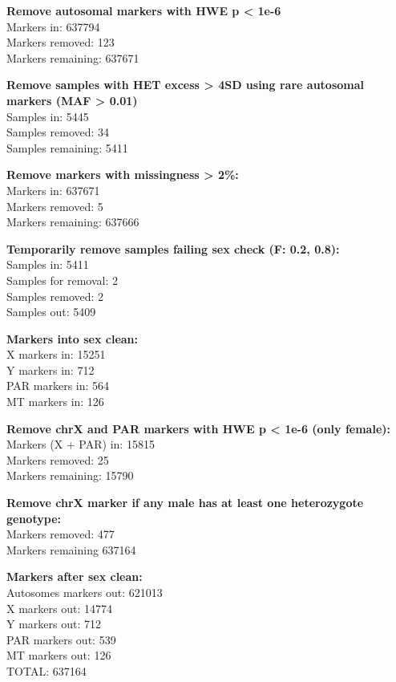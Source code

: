 \documentclass[]{article}
\begin{document}
\textbf{Remove autosomal markers with HWE p \textless{} 1e-6}\\
Markers in: 637794\\
Markers removed: 123\\
Markers remaining: 637671

\textbf{Remove samples with HET excess \textgreater{} 4SD using rare
autosomal markers (MAF \textgreater{} 0.01)}\\
Samples in: 5445\\
Samples removed: 34\\
Samples remaining: 5411

\textbf{Remove markers with missingness \textgreater{} 2\%:}\\
Markers in: 637671\\
Markers removed: 5\\
Markers remaining: 637666

\textbf{Temporarily remove samples failing sex check (F: 0.2, 0.8):}\\
Samples in: 5411\\
Samples for removal: 2\\
Samples removed: 2\\
Samples out: 5409

\textbf{Markers into sex clean:}\\
X markers in: 15251\\
Y markers in: 712\\
PAR markers in: 564\\
MT markers in: 126

\textbf{Remove chrX and PAR markers with HWE p \textless{} 1e-6 (only
female):}\\
Markers (X + PAR) in: 15815\\
Markers removed: 25\\
Markers remaining: 15790

\textbf{Remove chrX marker if any male has at least one heterozygote
genotype:}\\
Markers removed: 477\\
Markers remaining 637164

\textbf{Markers after sex clean:}\\
Autosomes markers out: 621013\\
X markers out: 14774\\
Y markers out: 712\\
PAR markers out: 539\\
MT markers out: 126\\
TOTAL: 637164
\end{document}
